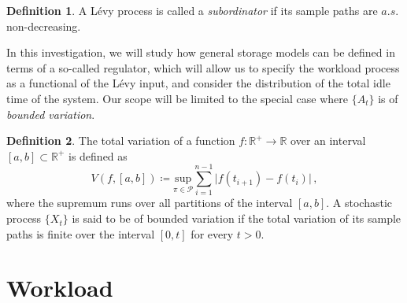 \documentclass[titlepage]{article}
\theoremstyle{plain}
\theoremstyle{definition}
\newtheorem{definition}{Definition}[section]
\begin{document}
\begin{definition}
  A L\'evy process is called a \emph{subordinator} if its sample paths are $a.s.$ non-decreasing.
\end{definition}

In this investigation, we will study how general storage models can be defined in terms of a so-called regulator, which will allow us to specify the workload process as a functional of the L\'evy input, and consider the distribution of the total idle time of the system. Our scope will be limited to the special case where $\{ A_t \}$ is of \emph{bounded variation}.

\begin{definition} \label{def:bounded-var}
  The total variation of a function $f: \mathbb{R}^+ \rightarrow \mathbb{R}$ over an interval $[a, b] \subset \mathbb{R}^+$ is defined as
  \begin{equation}
    V(f, [a, b]) \coloneqq \underset{{\pi \in \mathcal{P}}}{\mathrm{sup}} \sum_{i = 1}^{n - 1} \vert f(t_{i + 1}) - f(t_i) \vert \,,
  \end{equation}
  where the supremum runs over all partitions of the interval $[a, b]$. A stochastic process $\{ X_t \}$ is said to be of bounded variation if the total variation of its sample paths is finite over the interval $[0, t]$ for every $t > 0$.
\end{definition}

\section{Workload} \label{sec:workload}
\end{document}
